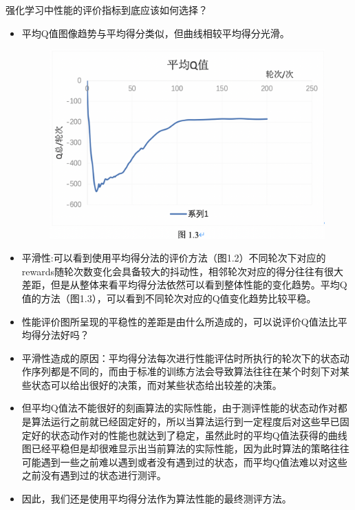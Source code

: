 \documentclass{beamer}
\begin{document}
\begin{frame}{强化学习中性能的评价指标到底应该如何选择？}
    \begin{itemize}
    \tiny
    \item 平均Q值图像趋势与平均得分类似，但曲线相较平均得分光滑。
   

    
        \begin{minipage}{0.5\linewidth}
        \medskip
        \begin{figure}[h]
            \centering
            \includegraphics[height=.4\textheight]{pic/24.png}
        \end{figure}
    \end{minipage}
    
    \item 平滑性:可以看到使用平均得分法的评价方法（图1.2）不同轮次下对应的rewards随轮次数变化会具备较大的抖动性，相邻轮次对应的得分往往有很大差距，但是从整体来看平均得分法依然可以看到整体性能的变化趋势。平均Q值的方法（图1.3），可以看到不同轮次对应的Q值变化趋势比较平稳。

    \item 性能评价图所呈现的平稳性的差距是由什么所造成的，可以说评价Q值法比平均得分法好吗？
    \item 平滑性造成的原因：平均得分法每次进行性能评估时所执行的轮次下的状态动作序列都是不同的，而由于标准的训练方法会导致算法往往在某个时刻下对某些状态可以给出很好的决策，而对某些状态给出较差的决策。
    \item 但平均Q值法不能很好的刻画算法的实际性能，由于测评性能的状态动作对都是算法运行之前就已经固定好的，所以当算法运行到一定程度后对这些早已固定好的状态动作对的性能也就达到了稳定，虽然此时的平均Q值法获得的曲线图已经平稳但是却很难显示出当前算法的实际性能，因为此时算法的策略往往可能遇到一些之前难以遇到或者没有遇到过的状态，而平均Q值法难以对这些之前没有遇到过的状态进行测评。
    \item 因此，我们还是使用平均得分法作为算法性能的最终测评方法。

    
    \end{itemize}
    
\end{frame}
\end{document}
